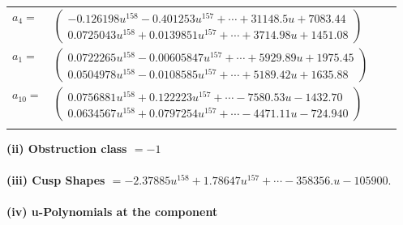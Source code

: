 \documentclass[1p]{elsarticle_modified}
\theoremstyle{definition}
\begin{document}
\begin{tabular}{m{7pt} m{180pt} m{7pt} m{180pt} }
\flushright $a_{4}=$&$\begin{pmatrix}-0.126198 u^{158}-0.401253 u^{157}+\cdots+31148.5 u+7083.44\\0.0725043 u^{158}+0.0139851 u^{157}+\cdots+3714.98 u+1451.08\end{pmatrix}$ \\
\flushright $a_{1}=$&$\begin{pmatrix}0.0722265 u^{158}-0.00605847 u^{157}+\cdots+5929.89 u+1975.45\\0.0504978 u^{158}-0.0108585 u^{157}+\cdots+5189.42 u+1635.88\end{pmatrix}$ \\
\flushright $a_{10}=$&$\begin{pmatrix}0.0756881 u^{158}+0.122223 u^{157}+\cdots-7580.53 u-1432.70\\0.0634567 u^{158}+0.0797254 u^{157}+\cdots-4471.11 u-724.940\end{pmatrix}$\\&\end{tabular}
\flushleft \textbf{(ii) Obstruction class $= -1$}\\~\\
\flushleft \textbf{(iii) Cusp Shapes $= -2.37885 u^{158}+1.78647 u^{157}+\cdots-358356. u-105900.$}\\~\\
\newpage\renewcommand{\arraystretch}{1}
\flushleft \textbf{(iv) u-Polynomials at the component}\newline \\
\end{document}
